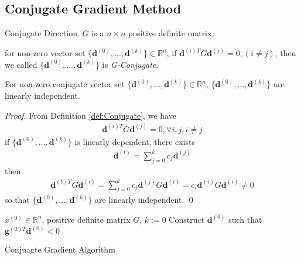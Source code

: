 \documentclass[runningheads]{llncs}
\begin{document}
\subsection{Conjugate Gradient Method}
\begin{definition}{Conjugate Direction.}
    $G$ is a $n \times n$ positive definite matrix, 
    \par\noindent for non-zero vector set
    $\{ \mathbf{d}^{(0)}, ...,\mathbf{d}^{(k)}\} \in \mathbb{R}^n$,
    if $\mathbf{d}^{(i)T} G \mathbf{d}^{(j)} = 0, (i \neq j)$,
    then we called $\{ \mathbf{d}^{(0)}, ...,\mathbf{d}^{(k)}\}$
    is \emph{G-Conjugate}.
    \label{def:Conjugate}
\end{definition}

\begin{lemma}
    For non-zero conjugate vector set 
    $\{ \mathbf{d}^{(0)}, ...,\mathbf{d}^{(k)}\} \in \mathbb{R}^n$,
    $\{ \mathbf{d}^{(0)}, ...,\mathbf{d}^{(k)}\}$ are linearly independent.
\end{lemma}
\begin{proof}
    From Definition \ref{def:Conjugate}, we have
    \begin{align}
        \mathbf{d}^{(i)T} G \mathbf{d}^{(j)} = 0, \forall i, j, i \neq j
    \end{align}
    if $\{ \mathbf{d}^{(0)}, ...,\mathbf{d}^{(k)}\}$ is linearly dependent,
    there exists 
    \begin{align}
        \mathbf{d}^{(t)} = \sum_{j=0}^k c_j \mathbf{d}^{(j)}
    \end{align} 
    then
    \begin{align}
        \mathbf{d}^{(t)T} G \mathbf{d}^{(i)} = 
        \sum_{j=0}^k c_j \mathbf{d}^{(j)} G \mathbf{d}^{(i)}
        = c_i \mathbf{d}^{(i)} G \mathbf{d}^{(i)} \neq 0
    \end{align}
    so that $\{ \mathbf{d}^{(0)}, ...,\mathbf{d}^{(k)}\}$
    are linearly independent.
    \qed
    \label{lemma:Conjugate}
\end{proof}

\begin{algorithm}[H]
    \SetAlgoLined
     $x^{(0)} \in \mathbb{R}^n$, positive definite matrix $G$, $k:= 0$\;
     Construct $\mathbf{d}^{(0)}$ such that
     $\mathbf{g}^{(0)T}\mathbf{d}^{(0)} < 0$\;
     \caption{Conjuagte Gradient Algorithm}
\end{algorithm}
\end{document}
